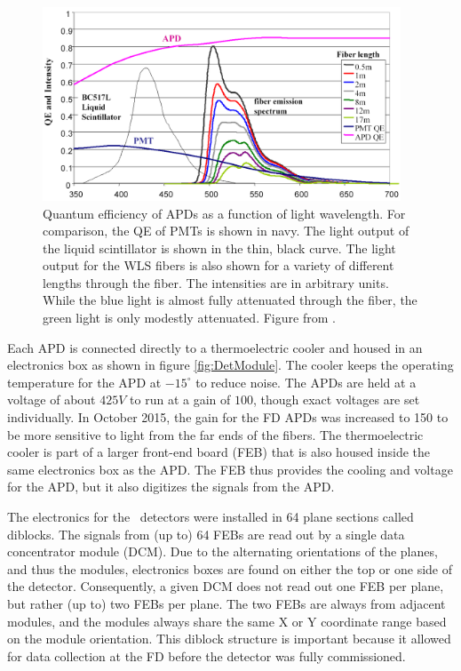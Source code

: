 \begin{figure}[htb]
  \centering
  \includegraphics[width=0.95\textwidth]{figures/APDvsPMT.png}
  \caption[Quantum Efficiency of APDs and Light Intensity Output of WLS fibers]{Quantum efficiency of APDs as a function of light wavelength. For comparison, the QE of PMTs is shown in navy. The light output of the liquid scintillator is shown in the thin, black curve. The light output for the WLS fibers is also shown for a variety of different lengths through the fiber. The intensities are in arbitrary units. While the blue light is almost fully attenuated through the fiber, the green light is only modestly attenuated. Figure from \cite{ref:TDRNOvA}.}
  \label{fig:APDvsPMT}
\end{figure}

Each APD is connected directly to a thermoelectric cooler and housed in an electronics box as shown in figure \ref{fig:DetModule}. The cooler keeps the operating temperature for the APD at $-15^\circ$ to reduce noise. The APDs are held at a voltage of about $425\unit{V}$ to run at a gain of $100$, though exact voltages are set individually. In October 2015, the gain for the FD APDs was increased to 150 to be more sensitive to light from the far ends of the fibers. The thermoelectric cooler is part of a larger front-end board (FEB) that is also housed inside the same electronics box as the APD. The FEB thus provides the cooling and voltage for the APD, but it also digitizes the signals from the APD.

The electronics for the \nova~detectors were installed in 64 plane sections called diblocks. The signals from (up to) 64 FEBs are read out by a single data concentrator module (DCM). Due to the alternating orientations of the planes, and thus the modules, electronics boxes are found on either the top or one side of the detector. Consequently, a given DCM does not read out one FEB per plane, but rather (up to) two FEBs per plane. The two FEBs are always from adjacent modules, and the modules always share the same X or Y coordinate range based on the module orientation. This diblock structure is important because it allowed for data collection at the FD before the detector was fully commissioned.

